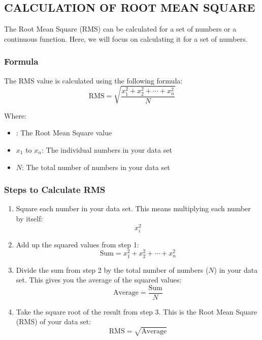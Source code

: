 \subsection{CALCULATION OF ROOT MEAN SQUARE}
The Root Mean Square (RMS) can be calculated for a set of numbers or a continuous function. Here, we will focus on calculating it for a set of numbers.

\subsubsection{Formula}
The RMS value is calculated using the following formula:
\begin{equation*}
    \text{RMS} = \sqrt{\frac{x_1^2 + x_2^2 + \cdots + x_n^2}{N}}
\end{equation*}

Where:
\begin{itemize}
    \item {}: The Root Mean Square value
    \item $x_1$ to $x_n$: The individual numbers in your data set
    \item $N$: The total number of numbers in your data set
\end{itemize}

\subsubsection{Steps to Calculate RMS}
\begin{enumerate}
    \item Square each number in your data set. This means multiplying each number by itself:
    \begin{equation*}
        x_i^2
    \end{equation*}
    
    \item Add up the squared values from step 1:
    \begin{equation*}
        \text{Sum} = x_1^2 + x_2^2 + \cdots + x_n^2
    \end{equation*}
    
    \item Divide the sum from step 2 by the total number of numbers ($N$) in your data set. This gives you the average of the squared values:
    \begin{equation*}
        \text{Average} = \frac{\text{Sum}}{N}
    \end{equation*}
    
    \item Take the square root of the result from step 3. This is the Root Mean Square (RMS) of your data set:
    \begin{equation*}
        \text{RMS} = \sqrt{\text{Average}}
    \end{equation*}
\end{enumerate}

